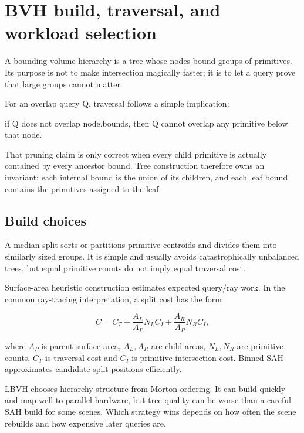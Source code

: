 \hypertarget{appendix-5653a7aea6bb}{}\label{referencestart:appendix-5653a7aea6bb}
\section{BVH build, traversal, and workload selection}\label{appendix-5653a7aea6bb-bvh-build-traversal-and-workload-selection}

\hypertarget{appendix-5653a7aea6bb-bvh-build-traversal-and-workload-selection}{}

A bounding-volume hierarchy is a tree whose nodes bound groups of primitives. Its purpose is not to make intersection magically faster; it is to let a query prove that large groups cannot matter.

For an overlap query Q, traversal follows a simple implication:

if Q does not overlap node.bounds, then Q cannot overlap any primitive below that node.

That pruning claim is only correct when every child primitive is actually contained by every ancestor bound. Tree construction therefore owns an invariant: each internal bound is the union of its children, and each leaf bound contains the primitives assigned to the leaf.

\subsection{Build choices}\label{appendix-5653a7aea6bb-build-choices}

\hypertarget{appendix-5653a7aea6bb-build-choices}{}

A median split sorts or partitions primitive centroids and divides them into similarly sized groups. It is simple and usually avoids catastrophically unbalanced trees, but equal primitive counts do not imply equal traversal cost.

Surface-area heuristic construction estimates expected query/ray work. In the common ray-tracing interpretation, a split cost has the form

\[
C = C_T +
\frac{A_L}{A_P}N_L C_I +
\frac{A_R}{A_P}N_R C_I,
\]

where \(A_P\) is parent surface area, \(A_L,A_R\) are child areas, \(N_L,N_R\) are primitive counts, \(C_T\) is traversal cost and \(C_I\) is primitive-intersection cost. Binned SAH approximates candidate split positions efficiently.

LBVH chooses hierarchy structure from Morton ordering. It can build quickly and map well to parallel hardware, but tree quality can be worse than a careful SAH build for some scenes. Which strategy wins depends on how often the scene rebuilds and how expensive later queries are.

